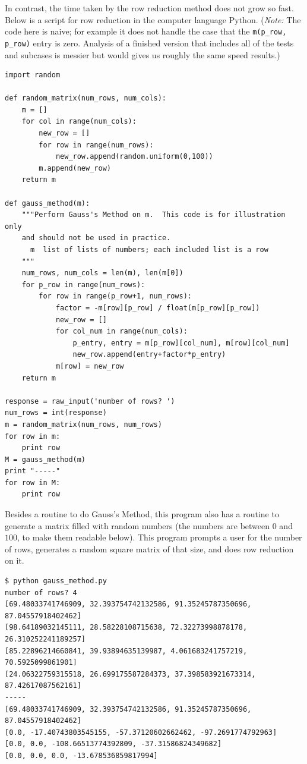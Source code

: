 In contrast, the time taken by the row reduction method does not grow so fast.
Below is a script for row reduction
in the computer language Python.
(\textit{Note:}
The code here is naive; for example it does not handle the case that 
the \lstinline[style=inline]!m(p_row, p_row)! entry is zero.
Analysis of a finished version that includes all of the tests
and subcases is messier but would gives us roughly the same speed
results.)
\begin{lstlisting}
import random

def random_matrix(num_rows, num_cols):
    m = []
    for col in range(num_cols):
        new_row = []
        for row in range(num_rows):
            new_row.append(random.uniform(0,100))
        m.append(new_row)
    return m

def gauss_method(m):
    """Perform Gauss's Method on m.  This code is for illustration only
    and should not be used in practice.
      m  list of lists of numbers; each included list is a row
    """
    num_rows, num_cols = len(m), len(m[0])
    for p_row in range(num_rows):
        for row in range(p_row+1, num_rows):
            factor = -m[row][p_row] / float(m[p_row][p_row])
            new_row = []
            for col_num in range(num_cols): 
                p_entry, entry = m[p_row][col_num], m[row][col_num]
                new_row.append(entry+factor*p_entry)
            m[row] = new_row
    return m

response = raw_input('number of rows? ')
num_rows = int(response)
m = random_matrix(num_rows, num_rows)
for row in m:
    print row
M = gauss_method(m)
print "-----"
for row in M:
    print row
\end{lstlisting}
Besides a routine to do Gauss's Method, this program also has a routine
to generate a matrix filled with random numbers (the numbers are
between $0$ and~$100$, to make them readable below).
This program prompts a user
for the number of rows, generates a random square matrix of
that size, and does row reduction on it.
\begin{lstlisting}
$ python gauss_method.py
number of rows? 4
[69.48033741746909, 32.393754742132586, 91.35245787350696, 87.04557918402462]
[98.64189032145111, 28.58228108715638, 72.32273998878178, 26.310252241189257]
[85.22896214660841, 39.93894635139987, 4.061683241757219, 70.5925099861901]
[24.06322759315518, 26.699175587284373, 37.398583921673314, 87.42617087562161]
-----
[69.48033741746909, 32.393754742132586, 91.35245787350696, 87.04557918402462]
[0.0, -17.40743803545155, -57.37120602662462, -97.2691774792963]
[0.0, 0.0, -108.66513774392809, -37.31586824349682]
[0.0, 0.0, 0.0, -13.678536859817994]
\end{lstlisting}  %

